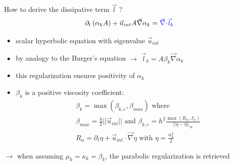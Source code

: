 \documentclass[xcolor=dvipsnames,10pt]{beamer}
\renewcommand{\div}{\vec{\nabla}\! \cdot \!}
\newcommand{\grad}{\vec{\nabla}}
\begin{document}
\begin{frame}{How to derive the dissipative term $\vec{l}$ ?}
\begin{equation}
\partial_t \left( \alpha_k  A\right) + \vec{u}_{int} A \grad \alpha_k = {\color{blue}\div \vec{l}_k} \nonumber
\end{equation}
\begin{block}{}
\begin{itemize}
\item scalar hyperbolic equation with eigenvalue $\vec{u}_{int}$
\item by analogy to the Burger's equation $\to$ $\vec{l}_k = A \beta_k \grad \alpha_k$
\item this regularization ensures positivity of $\alpha_k$
\item $\beta_k$ is a positive viscosity coefficient:
\begin{align}
&\beta_k = \max ( \beta_{k,e}, \beta_{max}) \text{ where }\nonumber \\
&\beta_{max} = \frac{h}{2} || \vec{u}_{int} || \text{ and } \beta_{k,e} = h^2 \frac{\max( R_\alpha, J_\alpha )}{|| \eta - \bar{\eta} ||_\infty} \nonumber \\
&R_\alpha = \partial_t \eta + \vec{u}_{int}\cdot \grad \eta \text{ with } \eta = \frac{\alpha_k^2}{2}  \nonumber
\end{align}
\end{itemize}
\end{block}
$\rightarrow$ when assuming $\mu_k = \kappa_k = \beta_k$, the parabolic regularization is retrieved
\end{frame}
\end{document}
